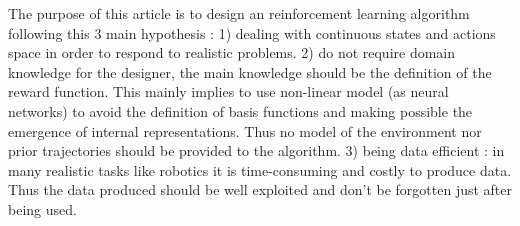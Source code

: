 The purpose of this article is to design an reinforcement learning algorithm following this 3 main hypothesis :
1) dealing with continuous states and actions space in order to respond to realistic problems.
2) do not require domain knowledge for the designer, the main knowledge should be the definition of the reward function.
This mainly implies to use non-linear model (as neural networks) to avoid the definition of basis functions and
making possible the emergence of internal representations. Thus no model of the environment nor prior trajectories should
be provided to the algorithm.
3) being data efficient : in many realistic tasks like robotics it is time-consuming and costly to produce data.
Thus the data produced should be well exploited and don't be forgotten just after being used.




